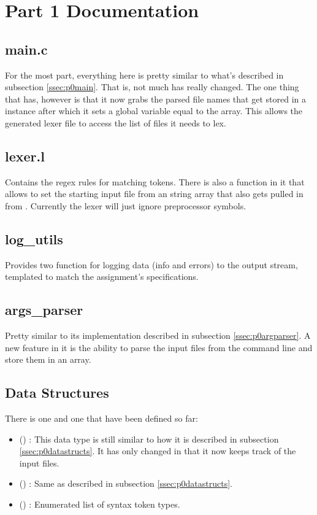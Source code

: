 \documentclass{article}
\begin{document}
\section{Part 1 Documentation}
\subsection{main.c} 
\label{ssec:p1main}
For the most part, everything here is pretty similar to what's described in subsection \ref{ssec:p0main}.
That is, not much has really changed.
The one thing that has, however is that it now grabs the parsed file names that get stored in a  instance after which it sets a global variable equal to the array.
This allows the generated lexer file to access the list of files it needs to lex.

\subsection{lexer.l} 
\label{ssec:p1lexer}
Contains the regex rules for matching tokens.
There is also a function in it that allows  to set the starting input file from an  string array that also gets pulled in from .
Currently the lexer will just ignore preprocessor symbols. 

\subsection{log\_utils} 
\label{ssec:p1logutils}
Provides two function for logging data (info and errors) to the output stream, templated to match the assignment's specifications.

\subsection{args\_parser} 
\label{ssec:p1argparser}
Pretty similar to its implementation described in subsection \ref{ssec:p0argparser}.
A new feature in it is the ability to parse the input files from the command line and store them in an array.

\subsection{Data Structures} 
\label{ssec:p1datastructs}
There is one  and one  that have been defined so far:
\begin{itemize}
    \item () : This data type is still similar to how it is described in subsection \ref{ssec:p0datastructs}.
        It has only changed in that it now keeps track of the input files.
    \item () : Same as described in subsection \ref{ssec:p0datastructs}.
    \item () : Enumerated list of syntax token types.
\end{itemize}
\end{document}
